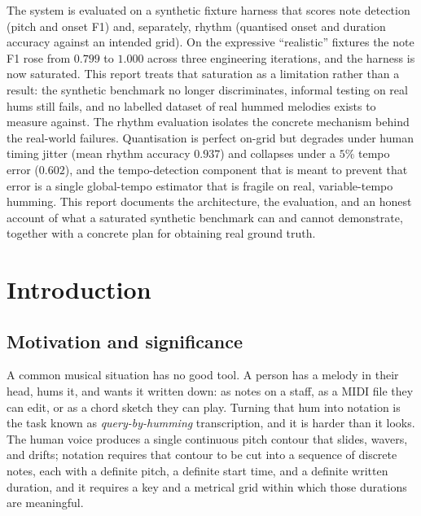 \documentclass[12pt,a4paper]{article}
\begin{document}
The system is evaluated on a synthetic fixture harness that scores note
detection (pitch and onset F1) and, separately, rhythm (quantised onset and
duration accuracy against an intended grid). On the expressive ``realistic''
fixtures the note F1 rose from $0.799$ to $1.000$ across three engineering
iterations, and the harness is now saturated. This report treats that
saturation as a limitation rather than a result: the synthetic benchmark no
longer discriminates, informal testing on real hums still fails, and no
labelled dataset of real hummed melodies exists to measure against. The rhythm
evaluation isolates the concrete mechanism behind the real-world failures.
Quantisation is perfect on-grid but degrades under human timing jitter (mean
rhythm accuracy $0.937$) and collapses under a $5\%$ tempo error ($0.602$), and
the tempo-detection component that is meant to prevent that error is a single
global-tempo estimator that is fragile on real, variable-tempo humming. This
report documents the architecture, the evaluation, and an honest account of
what a saturated synthetic benchmark can and cannot demonstrate, together with
a concrete plan for obtaining real ground truth.

\newpage
{}
\tableofcontents
\newpage
\listoffigures
\newpage
\listoftables
\newpage

\section{Introduction}

\subsection{Motivation and significance}

A common musical situation has no good tool. A person has a melody in their
head, hums it, and wants it written down: as notes on a staff, as a MIDI file
they can edit, or as a chord sketch they can play. Turning that hum into
notation is the task known as \emph{query-by-humming} transcription, and it is
harder than it looks. The human voice produces a single continuous pitch
contour that slides, wavers, and drifts; notation requires that contour to be
cut into a sequence of discrete notes, each with a definite pitch, a definite
start time, and a definite written duration, and it requires a key and a
metrical grid within which those durations are meaningful.
\end{document}
